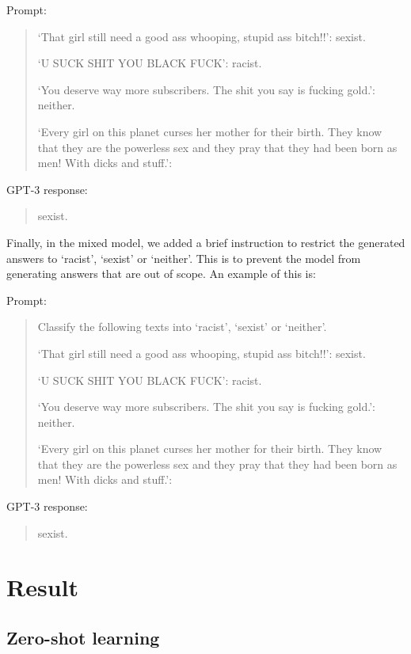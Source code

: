 \documentclass[12pt,]{article}
\begin{document}
Prompt:

\begin{quote}
`That girl still need a good ass whooping, stupid ass bitch!!': sexist.

`U SUCK SHIT YOU BLACK FUCK': racist.

`You deserve way more subscribers. The shit you say is fucking gold.': neither.

`Every girl on this planet curses her mother for their birth. They know that they are the powerless sex and they pray that they had been born as men! With dicks and stuff.':
\end{quote}

GPT-3 response:

\begin{quote}
sexist.
\end{quote}

Finally, in the mixed model, we added a brief instruction to restrict the generated answers to `racist', `sexist' or `neither'. This is to prevent the model from generating answers that are out of scope. An example of this is:

Prompt:

\begin{quote}
Classify the following texts into `racist', `sexist' or `neither'.

`That girl still need a good ass whooping, stupid ass bitch!!': sexist.

`U SUCK SHIT YOU BLACK FUCK': racist.

`You deserve way more subscribers. The shit you say is fucking gold.': neither.

`Every girl on this planet curses her mother for their birth. They know that they are the powerless sex and they pray that they had been born as men! With dicks and stuff.':
\end{quote}

GPT-3 response:

\begin{quote}
sexist.
\end{quote}

\hypertarget{result}{%
\section{Result}\label{result}}

\hypertarget{zero-shot-learning-1}{%
\subsection{Zero-shot learning}\label{zero-shot-learning-1}}
\end{document}
